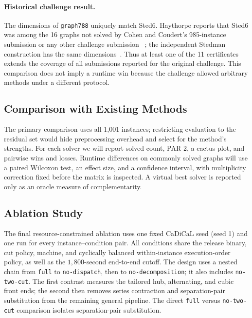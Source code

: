 \documentclass[sigconf,anonymous]{aamas}
\begin{document}
\paragraph{Historical challenge result.}
The dimensions of \texttt{graph788} uniquely match Sted6. Haythorpe
reports that Sted6 was among the 16 graphs not solved by Cohen and
Coudert's 985-instance submission or any other challenge submission
~\cite{haythorpe2018fhcp}; the independent Stedman construction has the
same dimensions~\cite{haythorpe2019change}. Thus at least one of the 11
certificates extends the coverage of all submissions reported for the
original challenge. This comparison does not imply a runtime win because
the challenge allowed arbitrary methods under a different protocol.

\subsection{Comparison with Existing Methods}
\label{sec:comparison}

The primary comparison uses all 1,001 instances; restricting evaluation
to the residual set would hide preprocessing overhead and select for the
method's strengths. For each solver we will report solved count, PAR-2,
a cactus plot, and pairwise wins and losses. Runtime differences on
commonly solved graphs will use a paired Wilcoxon test, an effect size,
and a confidence interval, with multiplicity correction fixed before the
matrix is inspected. A virtual best solver is reported only as an oracle
measure of complementarity.

\subsection{Ablation Study}
\label{sec:ablation}

The final resource-constrained ablation uses one fixed CaDiCaL seed
(seed 1) and one run for every instance--condition pair. All conditions
share the release binary, cut policy, machine, and cyclically balanced
within-instance execution-order policy, as well as the
$1{,}800$-second end-to-end cutoff. The design uses a nested chain from
\texttt{full} to \texttt{no-dispatch}, then to
\texttt{no-decomposition}; it also includes \texttt{no-two-cut}. The first contrast
measures the tailored hub, alternating, and cubic front ends; the second
then removes series contraction and separation-pair substitution from
the remaining general pipeline. The direct \texttt{full} versus
\texttt{no-two-cut} comparison isolates separation-pair substitution.
\end{document}
